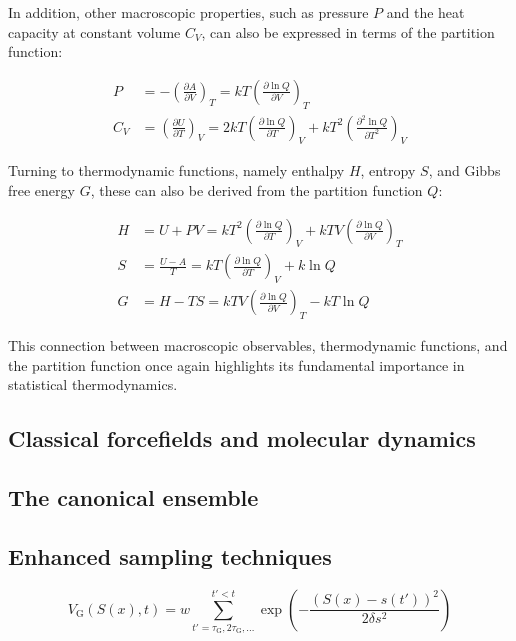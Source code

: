 In addition, other macroscopic properties, such as pressure $P$ and the heat capacity at constant volume $C_V$, can also be expressed in terms of the partition function:

\begin{align}
P &= -\left(\frac{\partial A}{\partial V}\right)_T = kT\left(\frac{\partial \ln Q}{\partial V}\right)_T \\
C_V &= \left(\frac{\partial U}{\partial T}\right)_V = 2kT\left(\frac{\partial \ln Q}{\partial T}\right)_V + kT^2\left(\frac{\partial^2 \ln Q}{\partial T^2}\right)_V
\end{align}

Turning to thermodynamic functions, namely enthalpy $H$, entropy $S$, and Gibbs free energy $G$, these can also be derived from the partition function $Q$:

\begin{align}
H &= U + PV = kT^2\left(\frac{\partial \ln Q}{\partial T}\right)_V + kTV\left(\frac{\partial \ln Q}{\partial V}\right)_T \\
S &= \frac{U-A}{T} = kT\left(\frac{\partial \ln Q}{\partial T}\right)_V + k\ln Q \\
G &= H - TS = kTV\left(\frac{\partial \ln Q}{\partial V}\right)_T - kT\ln Q
\end{align}

This connection between macroscopic observables, thermodynamic functions, and the partition function once again highlights its fundamental importance in statistical thermodynamics.

\subsection{Classical forcefields and molecular dynamics}

\subsection{The canonical ensemble}

\subsection{Enhanced sampling techniques}

\begin{equation}
V_{\text{G}}(S(x), t) = w \sum_{t' = \tau_{\text{G}}, 2\tau_{\text{G}}, \ldots}^{t' < t} \exp\left(-\frac{(S(x) - s(t'))^2}{2\delta s^2}\right)
\label{eq:biasing_potential}
\end{equation}


